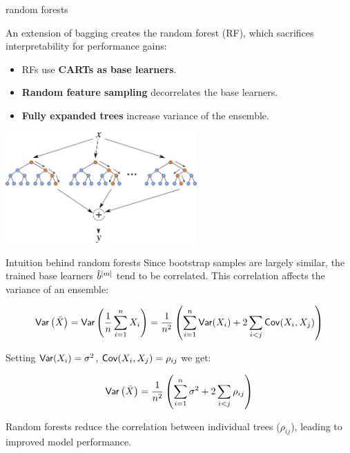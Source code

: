 \documentclass[11pt,compress,t,notes=noshow, xcolor=table]{beamer}
\begin{document}
\begin{vbframe}{random forests }

An extension of bagging creates the random forest (RF), which sacrifices interpretability for performance gains:

\begin{itemize}
\item RFs use \textbf{CARTs as base learners}. %
\item \textbf{Random feature sampling} decorrelates the base learners.
\item \textbf{Fully expanded trees} increase variance of the ensemble.
\end{itemize}

\begin{center}
\includegraphics[width=0.55\textwidth]{figure_man/forest.png}
\end{center}

\end{vbframe}


\begin{vbframe}{Intuition behind random forests}
Since bootstrap samples are largely similar, the trained base learners $\hat{b}^{[m]}$ tend to be correlated. This correlation affects the variance of an ensemble:

$$
\mathsf{Var}\left(\bar{X}\right) = \mathsf{Var}\left(\frac{1}{n} \sum_{i=1}^{n} X_i \right) = \frac{1}{n^2} \left( \sum_{i=1}^{n} \mathsf{Var}(X_i) + 2 \sum_{i < j} \mathsf{Cov}(X_i, X_j) \right)
$$

Setting $\mathsf{Var}(X_i) = \sigma^2$, $\mathsf{Cov}(X_i, X_j) = \rho_{ij}$ we get:

$$
\mathsf{Var}\left(\bar{X}\right) = \frac{1}{n^2} \left( \sum_{i=1}^{n} \sigma^2 + 2 \sum_{i < j} \rho_{ij} \right)
$$

Random forests reduce the correlation between individual trees ($\rho_{ij}$), leading to improved model performance.
\end{vbframe}
\end{document}

